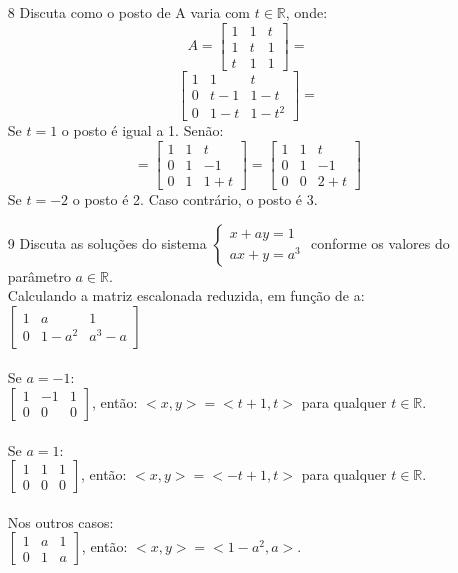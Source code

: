 \documentclass[a4paper]{article}
\begin{document}
\begin{itemize}
\item[8] Discuta como o posto de A varia com $t\in \mathbb{R}$, onde:
$$
A=\left[\begin{array}{ccc}
1&1&t\\1&t&1\\t&1&1
\end{array}\right]=
$$
\textcolor[rgb]{0,0,1}{
$$
\left[\begin{array}{ccc}
1&1&t\\0&t-1&1-t\\0&1-t&1-t^2
\end{array}\right]=
$$
Se $t=1$ o posto é igual a 1. Senão:
$$
=\left[\begin{array}{ccc}
1&1&t\\0&1&-1\\0&1&1+t
\end{array}\right]
=\left[\begin{array}{ccc}
1&1&t\\0&1&-1\\0&0&2+t
\end{array}\right]
$$
Se $t=-2$ o posto é 2. Caso contrário, o posto é 3.
}
\item[9] Discuta as soluções do sistema
$ \left\{
\begin{array}{ll}
\displaystyle x + ay = 1 \\
\displaystyle ax + y = a^3
\end{array}
\right.
$ conforme os valores do parâmetro $a \in \mathbb{R}.$
\\
\textcolor[rgb]{0,0,1}{Calculando a matriz escalonada reduzida, em função de a:
\\$
\left[\begin{array}{ccc}
1&a&1\\
0&1-a^2&a^3-a
\end{array}\right]
$
\\\\ Se $a=-1$:
\\$
\left[\begin{array}{ccc}
1&-1&1\\
0&0&0
\end{array}\right]
$, então: $<x,y>=<t+1,t>$ para qualquer $t\in \mathbb{R}$.
\\\\ Se $a=1$:
\\$
\left[\begin{array}{ccc}
1&1&1\\
0&0&0
\end{array}\right]
$, então: $<x,y>=<-t+1,t>$ para qualquer $t\in \mathbb{R}$.
\\\\ Nos outros casos:
\\$
\left[\begin{array}{ccc}
1&a&1\\
0&1&a
\end{array}\right]
$, então: $<x,y>=<1-a^2,a>$.
}


\end{itemize}
\end{document}
